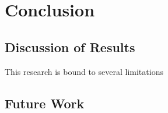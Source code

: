 \chapter{Conclusion}
\section{Discussion of Results}
This research is bound to several limitations
\section{Future Work}

\begin{comment}
- zusammenführen der artefakte in RAPADO
- recursive snarks -->auf den ersten Teil der EInleitung beziehen
\end{comment}
